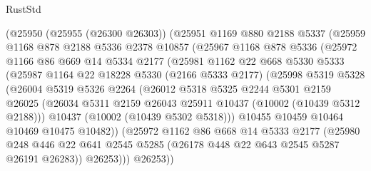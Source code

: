 \begin{lexlean}{RustStd}
\begin{coremodule}
          (@25950
            (@25955 (@26300 @26303))
            (@25951
              @1169
              @880
              @2188
              @5337
              (@25959
                @1168
                @878
                @2188
                @5336
                @2378
                @10857
                (@25967
                  @1168
                  @878
                  @5336
                  (@25972
                    @1166
                    @86
                    @669
                    @14
                    @5334
                    @2177
                    (@25981
                      @1162
                      @22
                      @668
                      @5330
                      @5333
                      (@25987
                        @1164
                        @22
                        @18228
                        @5330
                        (@2166 @5333 @2177)
                        (@25998
                          @5319
                          @5328
                          (@26004
                            @5319
                            @5326
                            @2264
                            (@26012
                              @5318
                              @5325
                              @2244
                              @5301
                              @2159
                              @26025
                              (@26034
                                @5311
                                @2159
                                @26043
                                @25911
                                @10437
                                (@10002 (@10439 @5312 @2188)))
                              @10437
                              (@10002 (@10439 @5302 @5318)))
                            @10455
                            @10459
                            @10464
                            @10469
                            @10475
                            @10482))
                        (@25972
                          @1162
                          @86
                          @668
                          @14
                          @5333
                          @2177
                          (@25980
                            @248
                            @446
                            @22
                            @641
                            @2545
                            @5285
                            (@26178 @448 @22 @643 @2545 @5287 @26191 @26283))
                          @26253)))
                    @26253))

\end{coremodule}
\end{lexlean}
